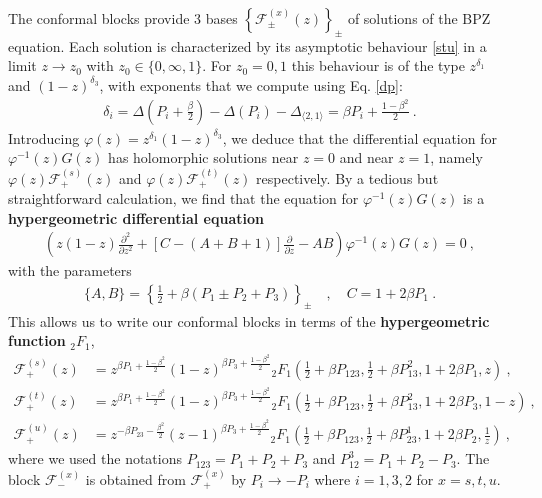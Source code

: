 \documentclass[12pt, a4paper]{article}
\newcommand{\myindex}[1]{\textbf{\boldmath #1}}
\theoremstyle{break}
\begin{document}
The conformal blocks provide 3 bases $\left\{\mathcal{F}^{(x)}_\pm(z)\right\}_\pm$ of solutions of the BPZ equation. Each solution is characterized by its asymptotic behaviour \eqref{stu} in a limit $z\to z_0$ with $z_0\in\{0,\infty,1\}$. 
For $z_0=0,1$ this behaviour is of the type $z^{\delta_1}$ and $(1-z)^{\delta_3}$, with exponents that we compute using Eq. \eqref{dp}:
\begin{align}
 \delta_i=\Delta\left(P_i+\tfrac{\beta}{2}\right) - \Delta(P_i) -\Delta_{\langle 2,1\rangle} = \beta P_i + \tfrac{1-\beta^2}{2}\ .
\end{align}
Introducing $\varphi(z) = z^{\delta_1}(1-z)^{\delta_3}$, we deduce that the differential equation for $\varphi^{-1}(z) G(z)$ has holomorphic solutions near $z=0$ and near $z=1$, namely $\varphi(z)\mathcal{F}^{(s)}_+(z)$ and $\varphi(z)\mathcal{F}^{(t)}_+(z)$ respectively. By a tedious but straightforward calculation, we find that the equation for $\varphi^{-1}(z) G(z)$ is a \myindex{hypergeometric differential equation} 
\begin{align}
 \left(z(1-z)\frac{\partial^2}{\partial z^2} + \left[C-(A+B+1)\right]\frac{\partial}{\partial z} -AB\right) \varphi^{-1}(z) G(z) = 0 \ , 
\end{align}
with the parameters 
\begin{align}
 \{A,B\} = \left\{\tfrac12+\beta(P_1\pm P_2+P_3)\right\}_\pm \quad , \quad  C=1+2\beta P_1\ .
\end{align}
This allows us to write our conformal blocks in terms of the \myindex{hypergeometric function}  ${}_2F_1$,
\begin{subequations}
\begin{align}
 \mathcal{F}_+^{(s)}(z) &= z^{\beta P_1 +\frac{1-\beta^2}{2}}(1-z)^{\beta P_3 + \frac{1-\beta^2}{2}} {}_2F_1\left(\tfrac12+ \beta P_{123},\tfrac12+\beta P_{13}^2,1+2\beta P_1,z\right) \ , 
 \\
 \mathcal{F}_+^{(t)}(z) &= z^{\beta P_1 +\frac{1-\beta^2}{2}}(1-z)^{\beta P_3 + \frac{1-\beta^2}{2}} {}_2F_1\left(\tfrac12+ \beta P_{123},\tfrac12+\beta P_{13}^2,1+2\beta P_3,1-z\right) \ , 
 \\
 \mathcal{F}_+^{(u)}(z) &= z^{-\beta P_{23} -\frac{\beta^2}{2}}(z-1)^{\beta P_3 + \frac{1-\beta^2}{2}} {}_2F_1\left(\tfrac12+ \beta P_{123},\tfrac12+\beta P_{23}^1,1+2\beta P_2,\tfrac{1}{z}\right) \ , 
\end{align}
\end{subequations}
where we used the notations $P_{123}=P_1+P_2+P_3$ and $P_{12}^3 = P_1+P_2-P_3$. The block $\mathcal{F}^{(x)}_-$ is obtained from $\mathcal{F}^{(x)}_+$ by $P_i\to -P_i$ where $i=1,3,2$ for $x=s,t,u$. 
\end{document}
